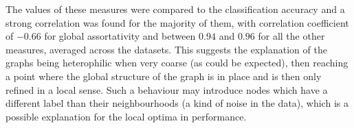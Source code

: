 The values of these measures were compared to the classification accuracy and a strong correlation was found for the majority of them, with correlation coefficient of \( -0.66 \) for global assortativity and between \( 0.94 \) and \( 0.96 \) for all the other measures, averaged across the datasets. This suggests the explanation of the graphs being heterophilic when very coarse (as could be expected), then reaching a point where the global structure of the graph is in place and is then only refined in a local sense. Such a behaviour may introduce nodes which have a different label than their neighbourhoods (a kind of noise in the data), which is a possible explanation for the local optima in performance.
